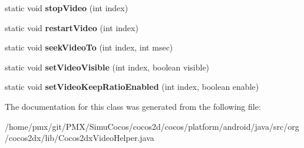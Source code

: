 \begin{DoxyCompactItemize}
\item 
\mbox{\label{classorg_1_1cocos2dx_1_1lib_1_1Cocos2dxVideoHelper_a4898234ff4997de05a6cb915eac94ec4}} 
static void {\bfseries stop\+Video} (int index)
\item 
\mbox{\label{classorg_1_1cocos2dx_1_1lib_1_1Cocos2dxVideoHelper_a8177a4fcac178fb4d12da2b8f33ec0aa}} 
static void {\bfseries restart\+Video} (int index)
\item 
\mbox{\label{classorg_1_1cocos2dx_1_1lib_1_1Cocos2dxVideoHelper_a98df60c8f207d12455b6ea15683b868c}} 
static void {\bfseries seek\+Video\+To} (int index, int msec)
\item 
\mbox{\label{classorg_1_1cocos2dx_1_1lib_1_1Cocos2dxVideoHelper_a91e8fa8107ad63e7dfb575ca55e46480}} 
static void {\bfseries set\+Video\+Visible} (int index, boolean visible)
\item 
\mbox{\label{classorg_1_1cocos2dx_1_1lib_1_1Cocos2dxVideoHelper_a808250609ecc8043573741ca4c4d46fc}} 
static void {\bfseries set\+Video\+Keep\+Ratio\+Enabled} (int index, boolean enable)
\end{DoxyCompactItemize}


The documentation for this class was generated from the following file\+:\begin{DoxyCompactItemize}
\item 
/home/pmx/git/\+P\+M\+X/\+Simu\+Cocos/cocos2d/cocos/platform/android/java/src/org/cocos2dx/lib/Cocos2dx\+Video\+Helper.\+java\end{DoxyCompactItemize}
